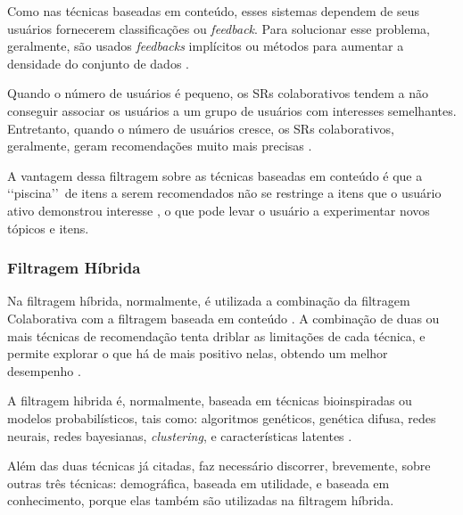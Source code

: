 Como nas técnicas baseadas em conteúdo, esses sistemas dependem de seus usuários fornecerem classificações ou \emph{feedback}. Para solucionar 
esse problema, geralmente, são usados \emph{feedbacks} implícitos ou métodos para aumentar 
a densidade do conjunto de dados \cite{paulson2003}.

Quando o número de usuários é pequeno, os SRs colaborativos tendem a não conseguir associar 
os usuários a um grupo de usuários com interesses semelhantes. Entretanto, quando o 
número de usuários cresce, os SRs colaborativos, geralmente, geram recomendações muito mais 
precisas \cite{mauricio}. 

A vantagem dessa filtragem sobre as técnicas baseadas em conteúdo é que a \lq\lq piscina\rq\rq\  de itens a serem recomendados 
não se restringe a itens que o usuário ativo demonstrou interesse \cite{paulson2003}, o que pode levar o usuário a experimentar novos tópicos e itens.


\subsubsection{Filtragem Híbrida}

Na filtragem híbrida, normalmente, é utilizada a combinação da filtragem Colaborativa com a filtragem 
baseada em conteúdo \cite{bobadilla2013}. A combinação de duas ou mais técnicas de recomendação tenta driblar as limitações de cada 
técnica, e permite explorar o que há de mais positivo nelas, obtendo um melhor desempenho \cite{burke2002}. 

A filtragem hibrida é, normalmente, baseada em técnicas bioinspiradas ou modelos probabilísticos, tais como: 
algoritmos genéticos, genética difusa, redes neurais, redes bayesianas, \emph{clustering}, e características latentes  \cite{bobadilla2013}.

Além das duas técnicas já citadas, faz necessário discorrer, brevemente, sobre outras três técnicas: demográfica, baseada em utilidade, 
e baseada em conhecimento, porque 
elas também são utilizadas na filtragem híbrida.

